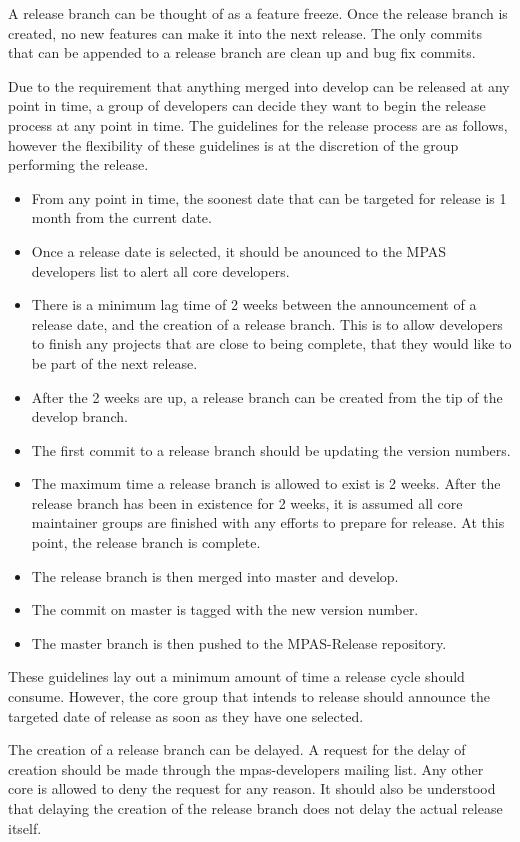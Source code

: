 \documentclass[11pt]{report}
\begin{document}
A release branch can be thought of as a feature freeze. Once the release branch
is created, no new features can make it into the next release. The only commits
that can be appended to a release branch are clean up and bug fix commits.

Due to the requirement that anything merged into develop can be released at any
point in time, a group of developers can decide they want to begin the release
process at any point in time. The guidelines for the release process are as
follows, however the flexibility of these guidelines is at the discretion of
the group performing the release.
\begin{itemize}
	\item From any point in time, the soonest date that can be targeted for release is 1 month from the current date.
	\item Once a release date is selected, it should be anounced to the MPAS developers list to alert all core developers.
	\item There is a minimum lag time of 2 weeks between the announcement of a release date, and the creation of a release branch. This is to allow developers to finish any projects that are close to being complete, that they would like to be part of the next release.
	\item After the 2 weeks are up, a release branch can be created from the tip of the develop branch.
	\item The first commit to a release branch should be updating the version numbers.
	\item The maximum time a release branch is allowed to exist is 2 weeks. After the release branch has been in existence for 2 weeks, it is assumed all core maintainer groups are finished with any efforts to prepare for release. At this point, the release branch is complete.
	\item The release branch is then merged into master and develop.
	\item The commit on master is tagged with the new version number.
	\item The master branch is then pushed to the MPAS-Release repository.
\end{itemize}

These guidelines lay out a minimum amount of time a release cycle should
consume. However, the core group that intends to release should announce the
targeted date of release as soon as they have one selected.

The creation of a release branch can be delayed. A request for the delay of
creation should be made through the mpas-developers mailing list. Any other
core is allowed to deny the request for any reason. It should also be
understood that delaying the creation of the release branch does not delay the
actual release itself.
\end{document}

